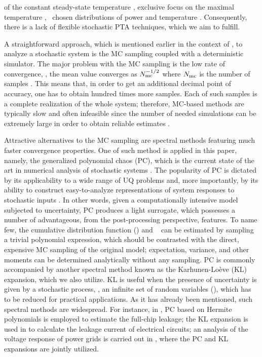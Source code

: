 of the constant steady-state temperature \cite{juan2011, juan2012}, exclusive focus on the maximal temperature \cite{juan2011}, \apriori\ chosen distributions of power and temperature \cite{juan2012, srivastava2010}. Consequently, there is a lack of flexible stochastic PTA techniques, which we aim to fulfill.


A straightforward approach, which is mentioned earlier in the context of \cite{chandra2010}, to analyze a stochastic system is the MC sampling coupled with a deterministic simulator. The major problem with the MC sampling is the low rate of convergence, \eg, the mean value converges as $N_\text{mc}^{-{{1}/{2}}}$ where $N_\text{mc}$ is the number of samples \cite{xiu2010, maitre2010}. This means that, in order to get an additional decimal point of accuracy, one has to obtain hundred times more samples. Each of such samples is a complete realization of the whole system; therefore, MC-based methods are typically slow and often infeasible since the number of needed simulations can be extremely large in order to obtain reliable estimates \cite{diaz-emparanza2002}.

Attractive alternatives to the MC sampling are spectral methods \cite{xiu2010, maitre2010, ghanem1991} featuring much faster convergence properties. One of such method is applied in this paper, namely, the generalized polynomial chaos (PC), which is the current state of the art in numerical analysis of stochastic systems \cite{xiu2010}. The popularity of PC is dictated by its applicability to a wide range of UQ problems and, more importantly, by its ability to construct easy-to-analyze representations of system responses to stochastic inputs \cite{eldred2009}. In other words, given a computationally intensive model subjected to uncertainty, PC produces a light surrogate, which possesses a number of advantageous, from the post-processing perspective, features. To name few, the cumulative distribution function (\cdf) and \pdf\ \cite{durrett2010} can be estimated by sampling a trivial polynomial expression, which should be contrasted with the direct, expensive MC sampling of the original model; expectation, variance, and other moments can be determined analytically without any sampling. PC is commonly accompanied by another spectral method known as the Karhunen-Lo\`{e}ve (KL) expansion, which we also utilize. KL is useful when the presence of uncertainty is given by a stochastic process, \ie, an infinite set of random variables (\rvs), which has to be reduced for practical applications. As it has already been mentioned, such spectral methods are widespread. For instance, in \cite{shen2009}, PC based on Hermite polynomials is employed to estimate the full-chip leakage; the KL expansion is used in \cite{bhardwaj2006} to calculate the leakage current of electrical circuits; an analysis of the voltage response of power grids is carried out in \cite{ghanta2006}, where the PC and KL expansions are jointly utilized.

